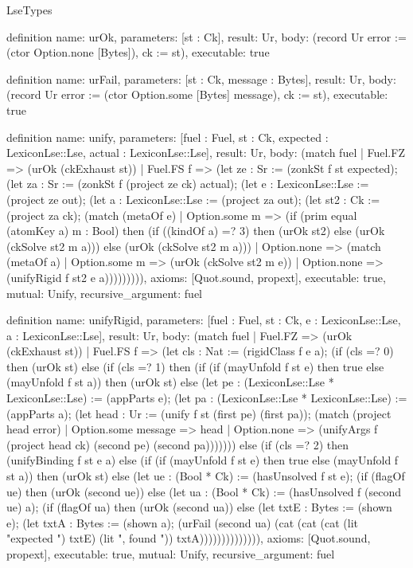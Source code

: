 \begin{lexlean}{LseTypes}
\begin{semanticmodule}
definition{
  name: urOk,
  parameters: [st : Ck],
  result: Ur,
  body: (record Ur {error := (ctor Option.none [Bytes]), ck := st}),
  executable: true
}

definition{
  name: urFail,
  parameters: [st : Ck, message : Bytes],
  result: Ur,
  body: (record Ur {error := (ctor Option.some [Bytes] message), ck := st}),
  executable: true
}

definition{
  name: unify,
  parameters: [fuel : Fuel, st : Ck, expected : LexiconLse::Lse, actual : LexiconLse::Lse],
  result: Ur,
  body: (match fuel
    | Fuel.FZ => (urOk (ckExhaust st))
    | Fuel.FS f => (let ze : Sr := (zonkSt f st expected); (let za : Sr := (zonkSt f (project ze ck) actual); (let e : LexiconLse::Lse := (project ze out); (let a : LexiconLse::Lse := (project za out); (let st2 : Ck := (project za ck); (match (metaOf e)
      | Option.some m => (if (prim equal (atomKey a) m : Bool) then (if ((kindOf a) =? 3) then (urOk st2) else (urOk (ckSolve st2 m a))) else (urOk (ckSolve st2 m a)))
      | Option.none => (match (metaOf a)
        | Option.some m => (urOk (ckSolve st2 m e))
        | Option.none => (unifyRigid f st2 e a))))))))),
  axioms: [Quot.sound, propext],
  executable: true,
  mutual: Unify,
  recursive_argument: fuel
}

definition{
  name: unifyRigid,
  parameters: [fuel : Fuel, st : Ck, e : LexiconLse::Lse, a : LexiconLse::Lse],
  result: Ur,
  body: (match fuel
    | Fuel.FZ => (urOk (ckExhaust st))
    | Fuel.FS f => (let cls : Nat := (rigidClass f e a); (if (cls =? 0) then (urOk st) else (if (cls =? 1) then (if (if (mayUnfold f st e) then true else (mayUnfold f st a)) then (urOk st) else (let pe : (LexiconLse::Lse * LexiconLse::Lse) := (appParts e); (let pa : (LexiconLse::Lse * LexiconLse::Lse) := (appParts a); (let head : Ur := (unify f st (first pe) (first pa)); (match (project head error)
      | Option.some message => head
      | Option.none => (unifyArgs f (project head ck) (second pe) (second pa))))))) else (if (cls =? 2) then (unifyBinding f st e a) else (if (if (mayUnfold f st e) then true else (mayUnfold f st a)) then (urOk st) else (let ue : (Bool * Ck) := (hasUnsolved f st e); (if (flagOf ue) then (urOk (second ue)) else (let ua : (Bool * Ck) := (hasUnsolved f (second ue) a); (if (flagOf ua) then (urOk (second ua)) else (let txtE : Bytes := (shown e); (let txtA : Bytes := (shown a); (urFail (second ua) (cat (cat (cat (lit "expected ") txtE) (lit ", found ")) txtA)))))))))))))),
  axioms: [Quot.sound, propext],
  executable: true,
  mutual: Unify,
  recursive_argument: fuel
}


\end{semanticmodule}
\end{lexlean}
